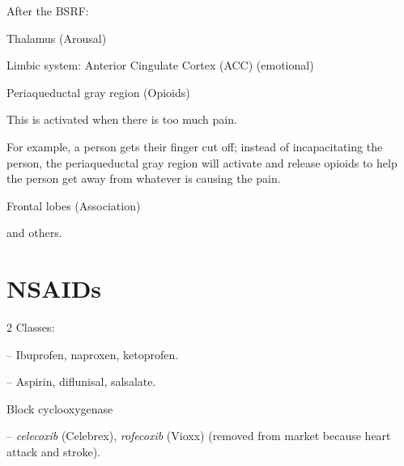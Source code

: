 \begin{coloredlist}
\begin{coloredlist}
\begin{coloredlist}
\begin{coloredlist}
                \item After the BSRF:
                \begin{coloredlist}
                    \item Thalamus (Arousal) 
                    \item Limbic system: Anterior Cingulate Cortex (ACC) (emotional)
                    \item Periaqueductal gray region (Opioids)
                    \begin{coloredlist}
                        \item This is activated when there is too much pain.
                        \item For example, a person gets their finger cut off; instead of incapacitating the person, the periaqueductal gray region will activate and release opioids to help the person get away from whatever is causing the pain.
                    \end{coloredlist}
                    \item Frontal lobes (Association)
                    \item and others.
                \end{coloredlist}       
            \end{coloredlist}
        \end{coloredlist}
    \end{coloredlist}    
\end{coloredlist}

\section{NSAIDs}

\begin{coloredlist}
    \item 2 Classes:
    \begin{coloredlist}
        \item {} -- Ibuprofen, naproxen, ketoprofen.
        \item {} -- Aspirin, diflunisal, salsalate.
    \end{coloredlist}
    \item Block cyclooxygenase
    \item {} -- \textit{celecoxib} (Celebrex), \textit{rofecoxib} (Vioxx) (removed from market because heart attack and stroke).
\end{coloredlist}

